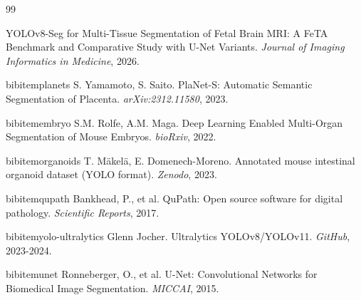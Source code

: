 \documentclass[12pt,a4paper]{article}
\begin{document}
\begin{thebibliography}{99}

YOLOv8-Seg for Multi-Tissue Segmentation of Fetal Brain MRI: A FeTA Benchmark and Comparative Study with U-Net Variants.
\textit{Journal of Imaging Informatics in Medicine}, 2026.

bibitem{planets}
S. Yamamoto, S. Saito.
PlaNet-S: Automatic Semantic Segmentation of Placenta.
\textit{arXiv:2312.11580}, 2023.

bibitem{embryo}
S.M. Rolfe, A.M. Maga.
Deep Learning Enabled Multi-Organ Segmentation of Mouse Embryos.
\textit{bioRxiv}, 2022.

bibitem{organoids}
T. Mäkelä, E. Domenech-Moreno.
Annotated mouse intestinal organoid dataset (YOLO format).
\textit{Zenodo}, 2023.

bibitem{qupath}
Bankhead, P., et al.
QuPath: Open source software for digital pathology.
\textit{Scientific Reports}, 2017.

bibitem{yolo-ultralytics}
Glenn Jocher.
Ultralytics YOLOv8/YOLOv11.
\textit{GitHub}, 2023-2024.

bibitem{unet}
Ronneberger, O., et al.
U-Net: Convolutional Networks for Biomedical Image Segmentation.
\textit{MICCAI}, 2015.

\end{thebibliography}
\end{document}
